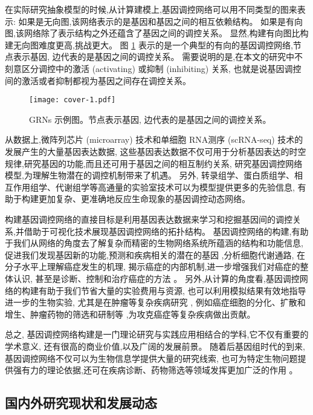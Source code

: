在实际研究抽象模型的时候,从计算建模上,基因调控网络可以用不同类型的图来表示:
如果是无向图,该网络表示的是基因和基因之间的相互依赖结构。
如果是有向图,该网络除了表示结构之外还蕴含了基因之间的调控关系。
显然,构建有向图比构建无向图难度更高,挑战更大。
图 \ref{cover-1} 表示的是一个典型的有向的基因调控网络,节点表示基因, 边代表的是基因之间的调控关系。
需要说明的是,在本文的研究中不刻意区分调控中的激活 (activating) 或抑制 (inhibiting) 关系,
也就是说基因调控间的激活或者抑制都视为基因之间存在调控关系。
\begin{figure}[!htbp]
    \centering
    \texttt{[image: cover-1.pdf]}
    \caption{GRNs 示例图。节点表示基因, 边代表的是基因之间的调控关系。}
    \label{cover-1}
\end{figure}

从数据上,微阵列芯片 (microarray) 技术和单细胞 RNA测序 (scRNA-seq) 技术的发展产生的大量基因表达数据,
这些基因表达数据不仅可用于分析基因表达的时空规律,研究基因的功能,而且还可用于基因之间的相互制约关系,
研究基因调控网络模型,为理解生物潜在的调控机制带来了机遇。
另外, 转录组学、蛋白质组学、相互作用组学、代谢组学等高通量的实验室技术可以为模型提供更多的先验信息,
有助于构建更加复杂、更准确地反应生命现象的基因调控动态网络。

构建基因调控网络的直接目标是利用基因表达数据来学习和挖掘基因间的调控关系,并借助于可视化技术展现基因调控网络的拓扑结构。
基因调控网络的构建,有助于我们从网络的角度去了解复杂而精密的生物网络系统所蕴涵的结构和功能信息,
促进我们发现基因新的功能,预测和疾病相关的潜在的基因 \cite{lee2009computational},分析细胞代谢通路,
在分子水平上理解癌症发生的机理,
揭示癌症的内部机制,进一步增强我们对癌症的整体认识,
甚至是诊断、控制和治疗癌症的方法 \cite{kreeger2009cancer,yan2016biological}。
另外,从计算的角度看,基因调控网络的构建有助于我们节省大量的实验费用与资源,
也可以利用模拟结果有效地指导进一步的生物实验,
尤其是在肿瘤等复杂疾病研究 \cite{boyle2017expanded},
例如癌症细胞的分化、扩散和增生、肿瘤药物的筛选和研制等 \cite{hurley2011gene},为攻克癌症等复杂疾病做出贡献。

总之, 基因调控网络构建是一门理论研究与实践应用相结合的学科,它不仅有重要的学术意义,
还有很高的商业价值,以及广阔的发展前景。
随着后基因组时代的到来,基因调控网络不仅可以为生物信息学提供大量的研究线索,
也可为特定生物问题提供强有力的理论依据,还可在疾病诊断、药物筛选等领域发挥更加广泛的作用 \cite{kreeger2009cancer}。

\subsection{国内外研究现状和发展动态}

